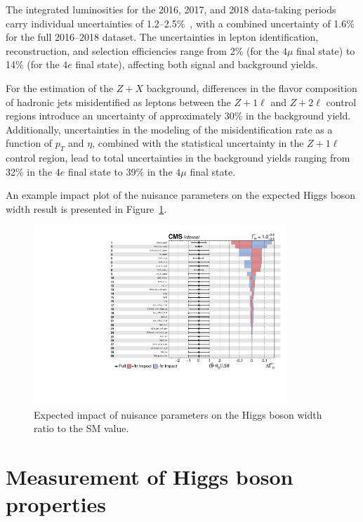 The integrated luminosities for the 2016, 2017, and 2018 data-taking periods carry individual uncertainties of 1.2--2.5\%~\cite{CMS-LUM-17-003,CMS-PAS-LUM-17-004,CMS-PAS-LUM-18-002}, with a combined uncertainty of 1.6\% for the full 2016--2018 dataset. The uncertainties in lepton identification, reconstruction, and selection efficiencies range from 2\% (for the $4\mu$ final state) to 14\% (for the $4e$ final state), affecting both signal and background yields.

For the estimation of the $Z + X$ background, differences in the flavor composition of hadronic jets misidentified as leptons between the $Z + 1\ell$ and $Z + 2\ell$ control regions introduce an uncertainty of approximately 30\% in the background yield. Additionally, uncertainties in the modeling of the misidentification rate as a function of $p_T$ and $\eta$, combined with the statistical uncertainty in the $Z + 1\ell$ control region, lead to total uncertainties in the background yields ranging from 32\% in the $4e$ final state to 39\% in the $4\mu$ final state.

An example impact plot of the nuisance parameters on the expected Higgs boson width result is presented in Figure~\ref{fig:impact}.

\begin{figure}[!hbt]
\begin{center}
\includegraphics[width=0.85\textwidth]{figures/impacts_all.pdf}
\caption
{
Expected impact of nuisance parameters on the Higgs boson width ratio to the SM value.
\label{fig:impact}
}
\end{center}
\end{figure}

\section{Measurement of Higgs boson properties} \label{sec:results}

